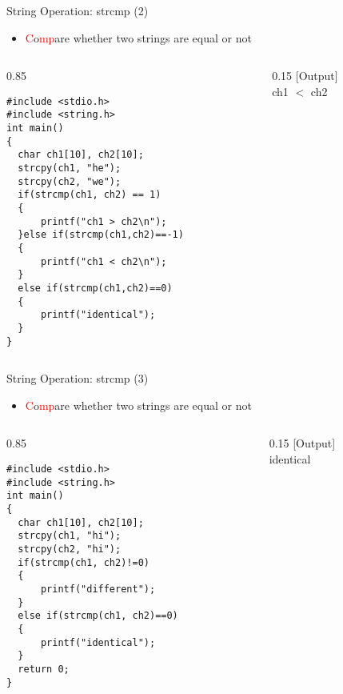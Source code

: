 \begin{frame}[fragile]{String Operation: strcmp (2)}
\vspace{-0.15in}
\begin{itemize}
	\item {\textcolor{red}{C}o\textcolor{red}{mp}are whether two strings are equal or not}
\end{itemize}
\vspace{-0.15in}
\begin{columns}
\begin{column}{0.85\linewidth}
\begin{lstlisting}[xleftmargin=0.05\linewidth, linewidth=0.94\linewidth]
#include <stdio.h>
#include <string.h>
int main()
{
  char ch1[10], ch2[10];
  strcpy(ch1, "he");
  strcpy(ch2, "we");
  if(strcmp(ch1, ch2) == 1)
  {
      printf("ch1 > ch2\n");
  }else if(strcmp(ch1,ch2)==-1)
  {
      printf("ch1 < ch2\n");
  }
  else if(strcmp(ch1,ch2)==0)
  {
      printf("identical");
  }
}
\end{lstlisting}
\end{column}
\begin{column}{0.15\linewidth}
[Output]\\
ch1 $<$ ch2
\end{column}
\end{columns}
\end{frame}

\begin{frame}[fragile]{String Operation: strcmp (3)}
\begin{itemize}
	\item {\textcolor{red}{C}o\textcolor{red}{mp}are whether two strings are equal or not}
\end{itemize}
\vspace{-0.15in}
\begin{columns}
\begin{column}{0.85\linewidth}
\begin{lstlisting}[xleftmargin=0.05\linewidth, linewidth=0.94\linewidth]
#include <stdio.h>
#include <string.h>
int main()
{
  char ch1[10], ch2[10];
  strcpy(ch1, "hi");
  strcpy(ch2, "hi");
  if(strcmp(ch1, ch2)!=0)
  {
      printf("different");
  }
  else if(strcmp(ch1, ch2)==0)
  {
      printf("identical");
  }
  return 0;
}
\end{lstlisting}
\end{column}
\begin{column}{0.15\linewidth}
[Output]\\
identical
\end{column}
\end{columns}
\end{frame}

